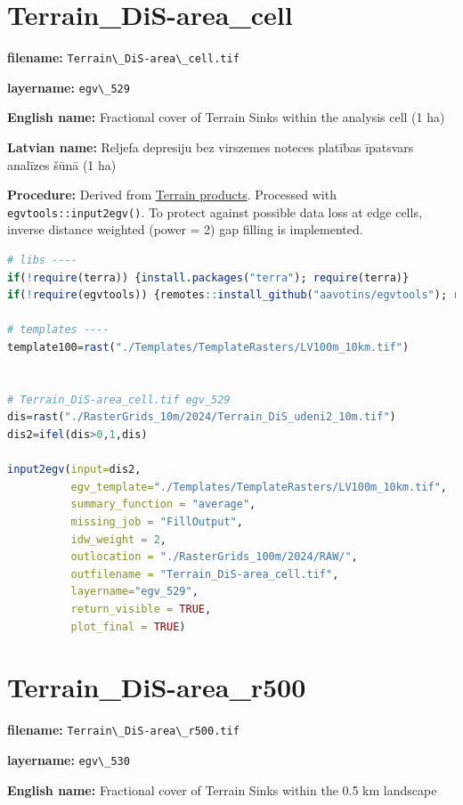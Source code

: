 \documentclass[
]{book}
\newcommand{\passthrough}[1]{#1}
\begin{document}
\section{Terrain\_DiS-area\_cell}\label{ch06.529}

\textbf{filename:} \passthrough{\lstinline!Terrain\_DiS-area\_cell.tif!}

\textbf{layername:} \passthrough{\lstinline!egv\_529!}

\textbf{English name:} Fractional cover of Terrain Sinks within the analysis cell (1 ha)

\textbf{Latvian name:} Reljefa depresiju bez virszemes noteces platības īpatsvars analīzes šūnā (1 ha)

\textbf{Procedure:} Derived from \hyperref[Ch05.01]{Terrain products}. Processed
with \passthrough{\lstinline!egvtools::input2egv()!}. To protect against
possible data loss at edge cells, inverse distance weighted (power = 2) gap filling
is implemented.

\begin{lstlisting}[language=R]
# libs ----
if(!require(terra)) {install.packages("terra"); require(terra)}
if(!require(egvtools)) {remotes::install_github("aavotins/egvtools"); require(egvtools)}

# templates ----
template100=rast("./Templates/TemplateRasters/LV100m_10km.tif")


# Terrain_DiS-area_cell.tif egv_529
dis=rast("./RasterGrids_10m/2024/Terrain_DiS_udeni2_10m.tif")
dis2=ifel(dis>0,1,dis)

input2egv(input=dis2,
          egv_template="./Templates/TemplateRasters/LV100m_10km.tif",
          summary_function = "average",
          missing_job = "FillOutput",
          idw_weight = 2,
          outlocation = "./RasterGrids_100m/2024/RAW/",
          outfilename = "Terrain_DiS-area_cell.tif",
          layername="egv_529",
          return_visible = TRUE,
          plot_final = TRUE)
\end{lstlisting}

\section{Terrain\_DiS-area\_r500}\label{ch06.530}

\textbf{filename:} \passthrough{\lstinline!Terrain\_DiS-area\_r500.tif!}

\textbf{layername:} \passthrough{\lstinline!egv\_530!}

\textbf{English name:} Fractional cover of Terrain Sinks within the 0.5 km landscape
\end{document}
